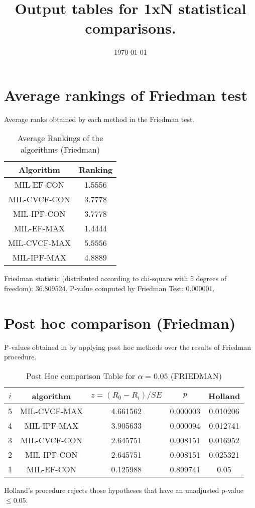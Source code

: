 \documentclass[a4paper,10pt]{article}
\title{Output tables for 1xN statistical comparisons.}
\author{}
\date{\today}
\begin{document}
\begin{landscape}
\pagestyle{empty}
\maketitle
\thispagestyle{empty}

\section{Average rankings of Friedman test}


Average ranks obtained by each method in the Friedman test.

\begin{table}[!htp]
\centering
\begin{tabular}{|c|c|}\hline
Algorithm&Ranking\\\hline
MIL-EF-CON&1.5556\\MIL-CVCF-CON&3.7778\\MIL-IPF-CON&3.7778\\MIL-EF-MAX&1.4444\\MIL-CVCF-MAX&5.5556\\MIL-IPF-MAX&4.8889\\\hline\end{tabular}
\caption{Average Rankings of the algorithms (Friedman)}
\end{table}

Friedman statistic (distributed according to chi-square with 5 degrees of freedom): 36.809524. \newline P-value computed by Friedman Test: 0.000001.\newline


\newpage

\section{Post hoc comparison (Friedman)}


P-values obtained in by applying post hoc methods over the results of Friedman procedure.

\begin{table}[!htp]
\centering\footnotesize
\begin{tabular}{ccccc}
$i$&algorithm&$z=(R_0 - R_i)/SE$&$p$&Holland\\
\hline5&MIL-CVCF-MAX&4.661562&0.000003&0.010206\\4&MIL-IPF-MAX&3.905633&0.000094&0.012741\\3&MIL-CVCF-CON&2.645751&0.008151&0.016952\\2&MIL-IPF-CON&2.645751&0.008151&0.025321\\1&MIL-EF-CON&0.125988&0.899741&0.05\\\hline
\end{tabular}
\caption{Post Hoc comparison Table for $\alpha=0.05$ (FRIEDMAN)}
\end{table}Holland's procedure rejects those hypotheses that have an unadjusted p-value $\le0.05$.



\end{landscape}
\end{document}
